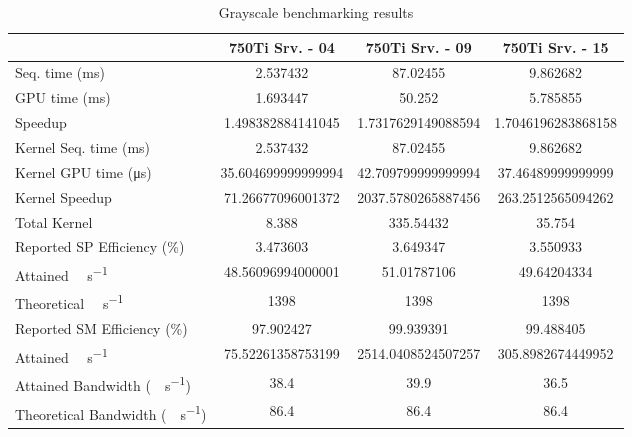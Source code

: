\begin{table}[H]
	\centering
	\caption{Grayscale benchmarking results}
	\label{tab:grayscale-results}
	\begin{tabular}{lS[table-format=7.1]S[table-format=7.1]S[table-format=7.1]}
		\toprule
			~ & {\textbf{750Ti Srv. - 04}} & {\textbf{750Ti Srv. - 09}} & {\textbf{750Ti Srv. - 15}} \\
		\midrule
			{Seq. time (\si{\milli\second})} & 2.537432 & 87.02455 & 9.862682 \\
			{GPU time (\si{\milli\second})} & 1.693447 & 50.252 & 5.785855 \\
			{Speedup} & 1.498382884141045 &1.7317629149088594 & 1.7046196283868158 \\
		\midrule
			{Kernel Seq. time (\si{\milli\second})} & 2.537432 & 87.02455 & 9.862682 \\
			{Kernel GPU time (\si{\micro\second})} & 35.604699999999994 & 42.709799999999994 & 37.46489999999999 \\
			{Kernel Speedup} & 71.26677096001372 & 2037.5780265887456 & 263.2512565094262 \\
		\midrule
			{Total Kernel \si{\mega\flops}} & 8.388 & 335.54432 & 35.754 \\
			{Reported SP Efficiency (\si{\percent})} & 3.473603 & 3.649347 & 3.550933 \\
			{Attained \si{\giga\flops\per\second}} & 48.56096994000001 & 51.01787106 & 49.64204334 \\
			{Theoretical \si{\giga\flops\per\second}} & 1398 & 1398 & 1398 \\
		\midrule
			{Reported SM Efficiency (\si{\percent})} & 97.902427 & 99.939391 & 99.488405 \\
			{Attained \si{\giga\iops\per\second}} & 75.52261358753199 & 2514.0408524507257 & 305.8982674449952 \\			
		\midrule
			{Attained Bandwidth (\si{\giga\byte\per\second})} & 38.4 & 39.9  & 36.5 \\
			{Theoretical Bandwidth (\si{\giga\byte\per\second})}	& 86.4 & 86.4 & 86.4 \\
		\bottomrule
	\end{tabular}
\end{table}